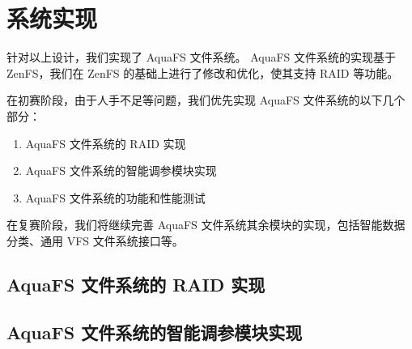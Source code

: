 \section{系统实现}

针对以上设计，我们实现了 AquaFS 文件系统。
AquaFS 文件系统的实现基于 ZenFS，我们在 ZenFS 的基础上进行了修改和优化，使其支持 RAID 等功能。

在初赛阶段，由于人手不足等问题，我们优先实现 AquaFS 文件系统的以下几个部分：

\begin{enumerate}
  \item AquaFS 文件系统的 RAID 实现
  \item AquaFS 文件系统的智能调参模块实现
  \item AquaFS 文件系统的功能和性能测试
\end{enumerate}

在复赛阶段，我们将继续完善 AquaFS 文件系统其余模块的实现，包括智能数据分类、通用 VFS 文件系统接口等。

\subsection{AquaFS 文件系统的 RAID 实现}



\subsection{AquaFS 文件系统的智能调参模块实现}
